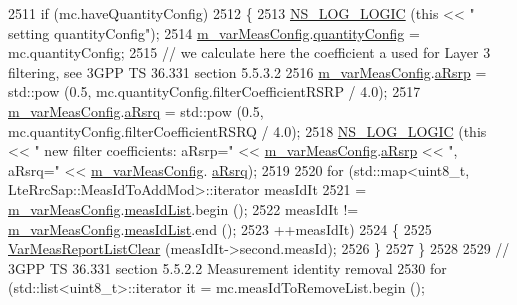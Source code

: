 \begin{DoxyCode}
2511   \textcolor{keywordflow}{if} (mc.haveQuantityConfig)
2512     \{
2513       \hyperlink{group__logging_ga88acd260151caf2db9c0fc84997f45ce}{NS\_LOG\_LOGIC} (\textcolor{keyword}{this} << \textcolor{stringliteral}{" setting quantityConfig"});
2514       \hyperlink{classns3_1_1LteUeRrc_a27a7773eedfdab964d2514d9eeb1c562}{m\_varMeasConfig}.\hyperlink{structns3_1_1LteUeRrc_1_1VarMeasConfig_a5e1c86a9be1d9117b9ebca85442ea36e}{quantityConfig} = mc.quantityConfig;
2515       \textcolor{comment}{// we calculate here the coefficient a used for Layer 3 filtering, see 3GPP TS 36.331 section 5.5.3.2}
2516       \hyperlink{classns3_1_1LteUeRrc_a27a7773eedfdab964d2514d9eeb1c562}{m\_varMeasConfig}.\hyperlink{structns3_1_1LteUeRrc_1_1VarMeasConfig_ae27b8f0c85f0d02a4d9ee4a397806bff}{aRsrp} = std::pow (0.5, mc.quantityConfig.filterCoefficientRSRP / 
      4.0);
2517       \hyperlink{classns3_1_1LteUeRrc_a27a7773eedfdab964d2514d9eeb1c562}{m\_varMeasConfig}.\hyperlink{structns3_1_1LteUeRrc_1_1VarMeasConfig_a3b110446d230054a65aeeeff4fda2fe3}{aRsrq} = std::pow (0.5, mc.quantityConfig.filterCoefficientRSRQ / 
      4.0);
2518       \hyperlink{group__logging_ga88acd260151caf2db9c0fc84997f45ce}{NS\_LOG\_LOGIC} (\textcolor{keyword}{this} << \textcolor{stringliteral}{" new filter coefficients: aRsrp="} << 
      \hyperlink{classns3_1_1LteUeRrc_a27a7773eedfdab964d2514d9eeb1c562}{m\_varMeasConfig}.\hyperlink{structns3_1_1LteUeRrc_1_1VarMeasConfig_ae27b8f0c85f0d02a4d9ee4a397806bff}{aRsrp} << \textcolor{stringliteral}{", aRsrq="} << \hyperlink{classns3_1_1LteUeRrc_a27a7773eedfdab964d2514d9eeb1c562}{m\_varMeasConfig}.
      \hyperlink{structns3_1_1LteUeRrc_1_1VarMeasConfig_a3b110446d230054a65aeeeff4fda2fe3}{aRsrq});
2519 
2520       \textcolor{keywordflow}{for} (std::map<uint8\_t, LteRrcSap::MeasIdToAddMod>::iterator measIdIt
2521              = \hyperlink{classns3_1_1LteUeRrc_a27a7773eedfdab964d2514d9eeb1c562}{m\_varMeasConfig}.\hyperlink{structns3_1_1LteUeRrc_1_1VarMeasConfig_aa7ad91f943892cec48ffa9a5ae872e8c}{measIdList}.begin ();
2522            measIdIt != \hyperlink{classns3_1_1LteUeRrc_a27a7773eedfdab964d2514d9eeb1c562}{m\_varMeasConfig}.\hyperlink{structns3_1_1LteUeRrc_1_1VarMeasConfig_aa7ad91f943892cec48ffa9a5ae872e8c}{measIdList}.end ();
2523            ++measIdIt)
2524         \{
2525           \hyperlink{classns3_1_1LteUeRrc_aa1a5d20a96dec717502ccf0030921f53}{VarMeasReportListClear} (measIdIt->second.measId);
2526         \}
2527     \}
2528 
2529   \textcolor{comment}{// 3GPP TS 36.331 section 5.5.2.2 Measurement identity removal}
2530   \textcolor{keywordflow}{for} (std::list<uint8\_t>::iterator it = mc.measIdToRemoveList.begin ();

\end{DoxyCode}
